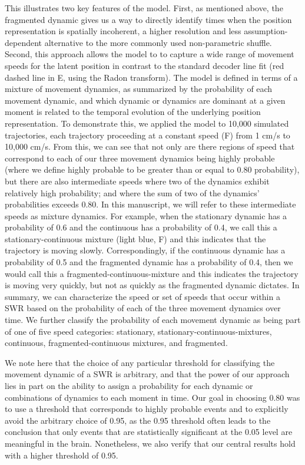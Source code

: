 \documentclass[9pt,lineno]{elife}
\begin{document}
This illustrates two key features of the model. First, as mentioned above, the fragmented dynamic gives us a way to directly identify times when the position representation is spatially incoherent, a higher resolution and less assumption-dependent alternative to the more commonly used non-parametric shuffle. Second, this approach allows the model to to capture a wide range of movement speeds for the latent position in contrast to the standard decoder line fit (red dashed line in E, using the Radon transform). The model is defined in terms of a mixture of movement dynamics, as summarized by the probability of each movement dynamic, and which dynamic or dynamics are dominant at a given moment is related to the temporal evolution of the underlying position representation. To demonstrate this, we applied the model to 10,000 simulated trajectories, each trajectory proceeding at a constant speed (F) from 1 cm/s to 10,000 cm/s. From this, we can see that not only are there regions of speed that correspond to each of our three movement dynamics being highly probable (where we define highly probable to be greater than or equal to 0.80 probability), but there are also intermediate speeds where two of the dynamics exhibit relatively high probability; and where the sum of two of the dynamics' probabilities exceeds 0.80. In this manuscript, we will refer to these intermediate speeds as mixture dynamics. For example, when the stationary dynamic has a probability of 0.6 and the continuous has a probability of 0.4, we call this a stationary-continuous mixture (light blue, F) and this indicates that the trajectory is moving slowly. Correspondingly, if the continuous dynamic has a probability of 0.5 and the fragmented dynamic has a probability of 0.4, then we would call this a fragmented-continuous-mixture and this indicates the trajectory is moving very quickly, but not as quickly as the fragmented dynamic dictates. In summary, we can characterize the speed or set of speeds that occur within a SWR based on the probability of each of the three movement dynamics over time. We further classify the probability of each movement dynamic as being part of one of five speed categories: stationary, stationary-continuous-mixtures, continuous, fragmented-continuous mixtures, and fragmented.

We note here that the choice of any particular threshold for classifying the movement dynamic of a SWR is arbitrary, and that the power of our approach lies in part on the ability to assign a probability for each dynamic or combinations of dynamics to each moment in time. Our goal in choosing 0.80 was to use a threshold that corresponds to highly probable events and to explicitly avoid the arbitrary choice of 0.95, as the 0.95 threshold often leads to the conclusion that only events that are statistically significant at the 0.05 level are meaningful in the brain. Nonetheless, we also verify that our central results hold with a higher threshold of 0.95. 
\end{document}
